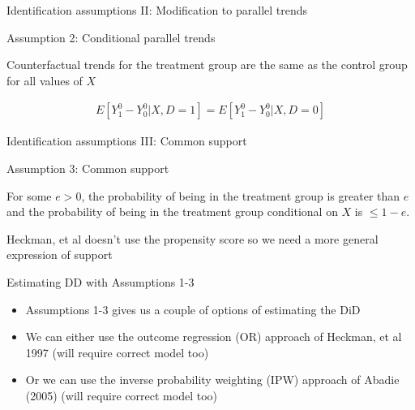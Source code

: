 \documentclass{beamer}
\begin{document}
\begin{frame}{Identification assumptions II: Modification to parallel trends}

Assumption 2: Conditional parallel trends

\bigskip

Counterfactual trends for the treatment group are the same as the control group for all values of $X$

\begin{eqnarray*}
E[Y_1^0 - Y_0^0 | X, D=1] = E[Y^0_1 - Y^0_0 | X, D=0]
\end{eqnarray*}

\end{frame}

\begin{frame}{Identification assumptions III: Common support}

Assumption 3: Common support

\bigskip

For some $e>0$, the probability of being in the treatment group is greater than $e$ and the probability of being in the treatment group conditional on $X$ is $\leq1-e$. 

\bigskip

Heckman, et al doesn't use the propensity score so we need a more general expression of support

\end{frame}

\begin{frame}{Estimating DD with Assumptions 1-3}

\begin{itemize}
\item Assumptions 1-3 gives us a couple of options of estimating the DiD
\item We can either use the outcome regression (OR) approach of Heckman, et al 1997 (will require correct model too)
\item Or we can use the inverse probability weighting (IPW) approach of Abadie (2005) (will require correct model too)
\end{itemize}

\end{frame}
\end{document}
